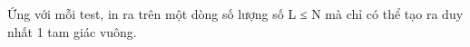 Ứng với mỗi test, in ra trên một dòng số lượng số L ≤ N mà chỉ có thể tạo ra duy nhất 1 tam giác vuông.